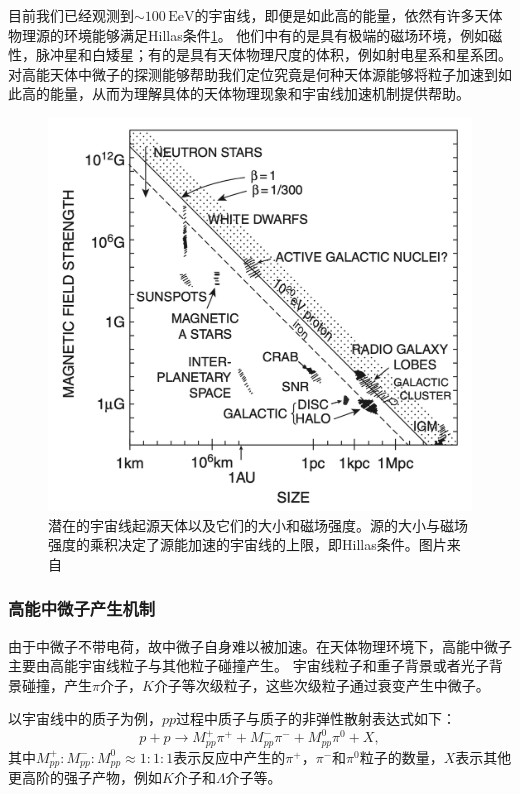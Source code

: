 目前我们已经观测到$\sim 100\,\mathrm{EeV}$的宇宙线，即便是如此高的能量，依然有许多天体物理源的环境能够满足Hillas条件\ref{fig:Hillas_limit}。
他们中有的是具有极端的磁场环境，例如磁性，脉冲星和白矮星；有的是具有天体物理尺度的体积，例如射电星系和星系团。
对高能天体中微子的探测能够帮助我们定位究竟是何种天体源能够将粒子加速到如此高的能量，从而为理解具体的天体物理现象和宇宙线加速机制提供帮助。

\begin{figure}[htb]
    \centering
    \includegraphics[width=0.8\linewidth]{img/Hillas_limit.png}
    \caption{潜在的宇宙线起源天体以及它们的大小和磁场强度。源的大小与磁场强度的乘积决定了源能加速的宇宙线的上限，即Hillas条件。图片来自\cite{Gaisser:2016}}
    \label{fig:Hillas_limit}
\end{figure}

\subsubsection{高能中微子产生机制}
\label{subsubsec:neutrino_production}

由于中微子不带电荷，故中微子自身难以被加速。在天体物理环境下，高能中微子主要由高能宇宙线粒子与其他粒子碰撞产生。
宇宙线粒子和重子背景或者光子背景碰撞，产生$\pi$介子，$K$介子等次级粒子，这些次级粒子通过衰变产生中微子。

以宇宙线中的质子为例，$pp$过程中质子与质子的非弹性散射表达式如下：
\begin{equation}
    p+p \rightarrow M_{p p}^{+} \pi^{+}+M_{p p}^{-} \pi^{-}+M_{p p}^0 \pi^0 + X ,
    \label{eq:pp_interaction}
\end{equation}
其中$M_{p p}^{+}: M_{p p}^{-}: M_{p p}^0 \approx 1: 1: 1$表示反应中产生的$\pi^{+}$，$\pi^{-}$和$\pi^{0}$粒子的数量，$X$表示其他更高阶的强子产物，例如$K$介子和$\Lambda$介子等。

